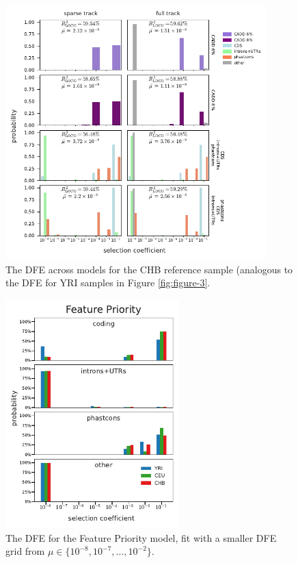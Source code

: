 \documentclass[11pt]{article}
\begin{document}
\begin{figure}[htbp]
    \label{suppfig:dfe-chb}
  \centering
  \includegraphics[width=0.9\textwidth]{figures/supplementary/figure_chb_dfe.pdf}
  \caption{The DFE across models for the CHB reference sample (analogous to the
  DFE for YRI samples in Figure \ref{fig:figure-3}.}
\end{figure}

\begin{figure}[htbp]
    \label{suppfig:dfe-pop-smallgrid-feature}
  \centering
  \includegraphics[width=0.6\textwidth]{figures/supplementary/feature_priority_pop_dfe_smallselgrid.pdf}
  \caption{The DFE for the Feature Priority model, fit with a smaller DFE grid from 
  $\mu \in \{10^{-8}, 10^{-7}, \ldots, 10^{-2}\}$.}
\end{figure}
\end{document}
